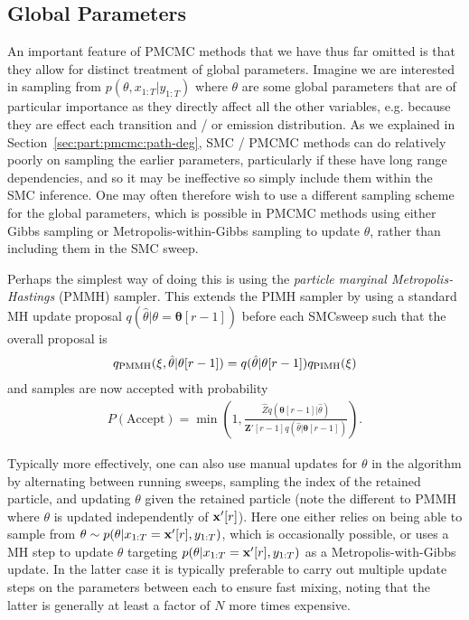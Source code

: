 \subsection{Global Parameters}
\label{sec:part:pmcmc:global}

An important feature of PMCMC methods that we have thus far omitted is that they allow for
distinct treatment of global parameters.  Imagine we are interested in sampling from $p(\theta,x_{1:T} | y_{1:T})$
where $\theta$ are some global parameters that are of particular importance as they directly
affect all the other variables, e.g. because they are effect each transition and / or emission distribution.
As we explained in Section~\ref{sec:part:pmcmc:path-deg}, SMC / PMCMC methods can do relatively poorly on sampling
the earlier parameters, particularly if these have long range dependencies, and so it may be ineffective so
simply include them within the SMC inference. One may often therefore wish to use a different sampling scheme
for the global parameters, which is possible in PMCMC methods using either Gibbs sampling or Metropolis-within-Gibbs
sampling to update $\theta$, rather than including them in the SMC sweep.

Perhaps the simplest way of doing this is using the \emph{particle marginal Metropolis-Hastings} (PMMH)
sampler.  This extends the PIMH sampler by using a standard MH update proposal $q(\hat{\theta}|\theta=\mathbf{\theta}[r-1])$ 
before each SMCsweep such that the overall proposal is
\begin{align}
q_{\text{PMMH}}(\mathbf{\xi},\hat{\theta}|\mathbf{\theta}[r-1]) = q(\hat{\theta}|\mathbf{\theta}[r-1]) q_{\text{PIMH}}(\mathbf{\xi})
\end{align}
and samples are now accepted with probability
\begin{align}
P(\text{Accept}) = \min \left(1,\frac{\hat{Z} q(\mathbf{\theta}[r-1] | \hat{\theta})}
{\mathbf{Z}'[r-1] q(\hat{\theta}|\mathbf{\theta}[r-1])}\right).
\end{align}

Typically more effectively, one can also use manual updates for $\theta$ in the \pg algorithm by alternating
between running \csmc sweeps, sampling the index of the retained particle, and updating $\theta$ given
the retained particle (note the different to PMMH where $\theta$ is updated independently of $\mathbf{x}'[r]$).
Here one either relies on being able to sample from $\theta \sim p(\theta | x_{1:T}=\mathbf{x}'[r], y_{1:T})$, which is 
occasionally possible, or uses a MH step to update $\theta$ targeting $p(\theta | x_{1:T}=\mathbf{x}'[r], y_{1:T})$ as
a Metropolis-with-Gibbs update.  In the latter case it is typically preferable to carry out multiple update steps
on the parameters between each \csmc to ensure fast mixing, noting that the latter is generally at least a 
factor of $N$ more times expensive.

